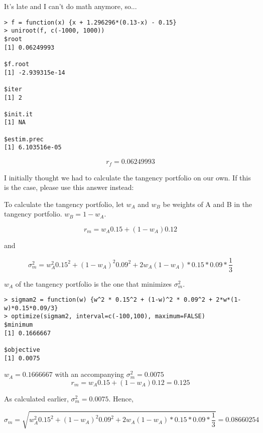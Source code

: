 \documentclass[11pt]{scrartcl}
\begin{document}
It's late and I can't do math anymore, so...

\begin{lstlisting}
> f = function(x) {x + 1.296296*(0.13-x) - 0.15}
> uniroot(f, c(-1000, 1000))
$root
[1] 0.06249993

$f.root
[1] -2.939315e-14

$iter
[1] 2

$init.it
[1] NA

$estim.prec
[1] 6.103516e-05
\end{lstlisting}

\[r_f = 0.06249993\]

\hrulefill

I initially thought we had to calculate the tangency portfolio on our own. If this is the case, please use this answer instead:

To calculate the tangency portfolio, let $w_A$ and $w_B$ be weights of A and B in the tangency portfolio. $w_B = 1-w_A$.

\[r_m = w_A 0.15 + (1-w_A) 0.12\]

and

\[\sigma_m^2 = w_A^2 0.15^2 + (1-w_A)^2 0.09^2 + 2w_A(1-w_A)*0.15*0.09*\frac{1}{3}\]

$w_A$ of the tangency portfolio is the one that minimizes $\sigma_m^2$.

\begin{lstlisting}
> sigmam2 = function(w) {w^2 * 0.15^2 + (1-w)^2 * 0.09^2 + 2*w*(1-w)*0.15*0.09/3}
> optimize(sigmam2, interval=c(-100,100), maximum=FALSE)
$minimum
[1] 0.1666667

$objective
[1] 0.0075
\end{lstlisting}

$w_A = 0.1666667$ with an accompanying $\sigma_m^2 = 0.0075$
\[r_m = w_A 0.15 + (1-w_A)0.12 = 0.125\]

As calculated earlier, $\sigma_m^2 = 0.0075$. Hence, 

\[\sigma_m = \sqrt{ w_A^2 0.15^2 + (1-w_A)^2 0.09^2 + 2w_A(1-w_A)*0.15*0.09*\frac{1}{3}} = 0.08660254\]
\end{document}
